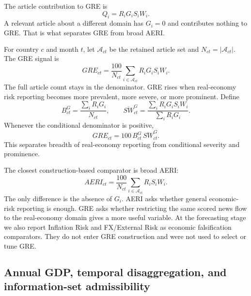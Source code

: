 \documentclass[preprint,12pt,authoryear]{elsarticle}
\begin{document}
The article contribution to GRE is
\begin{equation}
Q_i = R_i G_i S_i W_i.
\label{eq:article}
\end{equation}
A relevant article about a different domain has $G_i = 0$ and contributes
nothing to GRE. That is what separates GRE from broad AERI.




For country $c$ and month $t$, let $\mathcal{A}_{ct}$ be the retained article
set and $N_{ct} = |\mathcal{A}_{ct}|$. The GRE signal is
\begin{equation}
GRE_{ct} = \frac{100}{N_{ct}} \sum_{i \in \mathcal{A}_{ct}} R_i G_i S_i W_i.
\label{eq:gre}
\end{equation}
The full article count stays in the denominator. GRE rises when real-economy
risk reporting becomes more prevalent, more severe, or more prominent. Define
\begin{equation}
B^G_{ct} = \frac{\sum_i R_i G_i}{N_{ct}}, \qquad
\overline{SW}^G_{ct} = \frac{\sum_i R_i G_i S_i W_i}{\sum_i R_i G_i}.
\label{eq:decomp_parts}
\end{equation}
Whenever the conditional denominator is positive,
\begin{equation}
GRE_{ct} = 100 \, B^G_{ct} \, \overline{SW}^G_{ct}.
\label{eq:decomp}
\end{equation}
This separates breadth of real-economy reporting from conditional severity and
prominence.

The closest construction-based comparator is broad AERI:
\begin{equation}
AERI_{ct} = \frac{100}{N_{ct}} \sum_{i \in \mathcal{A}_{ct}} R_i S_i W_i.
\label{eq:aeri_comp}
\end{equation}
The only difference is the absence of $G_i$. AERI asks whether general
economic-risk reporting is enough. GRE asks whether restricting the same
scored news flow to the real-economy domain gives a more useful variable. At
the forecasting stage we also report Inflation Risk and FX/External Risk as
economic falsification comparators. They do not enter GRE construction and
were not used to select or tune GRE.

\subsection{Annual GDP, temporal disaggregation, and information-set
admissibility}
\end{document}
